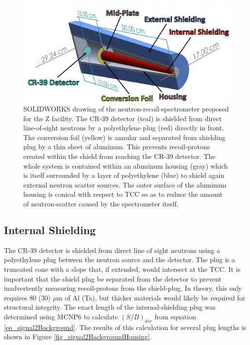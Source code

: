 \begin{figure}[h!]
	
	\centering
	\includegraphics[scale=1.5]{Figures/shieldedSpectrometer.pdf}
	\caption{SOLIDWORKS drawing of the neutron-recoil-spectrometer proposed for the Z facility. The CR-39 detector (teal) is shielded from direct line-of-sight neutrons by a polyethylene plug (red) directly in front. The conversion foil (yellow) is annular and separated from shielding plug by a thin sheet of aluminum. This prevents recoil-protons created within the shield from reaching the CR-39 detector. The whole system is contained within an aluminum housing (gray) which is itself surrounded by a layer of polyethylene (blue) to shield again external neutron scatter sources. The outer surface of the aluminum housing is conical with respect to TCC so as to reduce the amount of neutron-scatter caused by the spectrometer itself. }
	\label{fig_shieldedSpectrometer}
	
\end{figure}

\subsection{Internal Shielding}

The CR-39 detector is shielded from direct line of sight neutrons using a polyethylene plug between the neutron source and the detector. The plug is a truncated cone with a slope that, if extended, would intersect at the TCC. It is important that the shield plug be separated from the detector to prevent inadvertently measuring recoil-protons from the shield-plug. In theory, this only requires 80 (30) $\mu$m of Al (Ta), but thicker materials would likely be required for structural integrity. The exact length of the internal-shielding plug was determined using MCNP6 to calculate $(S/B)_{dsr}$ from equation \ref{eq_signal2Background}. The results of this calculation for several plug lengths is shown in Figure \ref{fig_signal2BackgroundHousing}.

